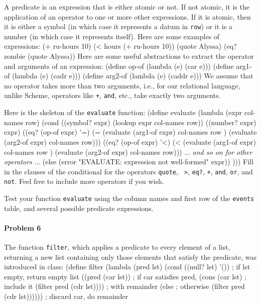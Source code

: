 A predicate is an expression that is either atomic or not.  If not atomic,
it is the application of an operator to one or more other expressions.  If it
is atomic, then it is either a symbol (in which case it represents a datum in
{\tt row}) or it is a number (in which case it represents itself).  Here
are some examples of expressions:
(+ ru-hours 10)
(< hours (+ ru-hours 10))
(quote Alyssa)
(eq? zombie (quote Alyssa))
 \endlisp
 Here are some useful abstractions to extract the operator and arguments of an expression:
 \beginlisp
(define op-of   (lambda (e) (car e)))
(define arg1-of (lambda (e) (cadr e)))
(define arg2-of (lambda (e) (caddr e)))
 \endlisp
 We assume that no operator takes more than two arguments, i.e., for our
relational language, unlike Scheme, operators like {\tt +}, {\tt and}, etc.,
take exactly two arguments.

 Here is the skeleton of the {\tt evaluate} function:
 \beginlisp
(define evaluate
  (lambda (expr col-names row)
    (cond
      ((symbol? expr)      (lookup expr col-names row))
      ((number? expr)      expr)
      ((eq? (op-of expr) '=) (= (evaluate (arg1-of expr) col-names row )
                                (evaluate (arg2-of expr) col-names row)))
      ((eq? (op-of expr) '<) (< (evaluate (arg1-of expr) col-names row )
                                (evaluate (arg2-of expr) col-names row)))
\null
      ... {\it and so on for other operators\/} ...
\null
      (else (error "EVALUATE: expression not well-formed" expr))
    )))
 \endlisp
 Fill in the clauses of the conditional for the operators {\tt quote}, {\tt
>}, {\tt eq?}, {\tt +}, {\tt and}, {\tt or}, and {\tt not}.
Feel free to include more operators if you wish.

Test your function {\tt evaluate} using the column names and first row of the
{\tt events} table, and several possible predicate expressions.

\paragraph{Problem 6}

The function {\tt filter}, which applies a predicate to every element of a
list, returning a new list containing only those elements that satisfy the
predicate, was introduced in class:
 \beginlisp
(define filter
  (lambda (pred lst)
    (cond
      ((null? lst)      '())                  ; if lst empty, return empty list
      ((pred (car lst))                       ; if car satisfies pred,
           (cons (car lst)                    ;    include it
                 (filter pred (cdr lst))))    ;            with  remainder
      (else                                   ; otherwise
           (filter pred (cdr lst))))))        ;    discard car, do remainder
 \endlisp

